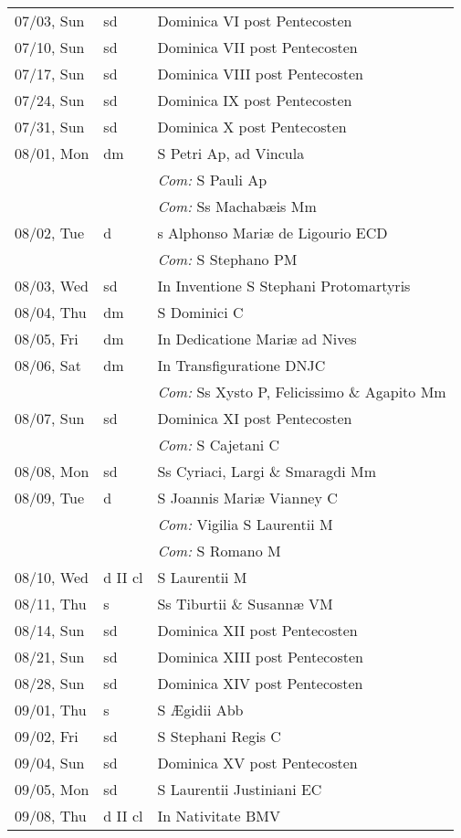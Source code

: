 \documentclass[10pt]{article}
\begin{document}
\begin{longtable}{ l l l }
07/03, Sun & sd & Dominica VI post Pentecosten\\
07/10, Sun & sd & Dominica VII post Pentecosten\\
07/17, Sun & sd & Dominica VIII post Pentecosten\\
07/24, Sun & sd & Dominica IX post Pentecosten\\
07/31, Sun & sd & Dominica X post Pentecosten\\
08/01, Mon & dm & S Petri Ap, ad Vincula\\
 & & \textit{Com:} S Pauli Ap\\
 & & \textit{Com:} Ss Machabæis Mm\\
08/02, Tue & d & s Alphonso Mariæ de Ligourio ECD\\
 & & \textit{Com:} S Stephano PM\\
08/03, Wed & sd & In Inventione S Stephani Protomartyris\\
08/04, Thu & dm & S Dominici C\\
08/05, Fri & dm & In Dedicatione Mariæ ad Nives\\
08/06, Sat & dm & In Transfiguratione DNJC\\
 & & \textit{Com:} Ss Xysto P, Felicissimo \& Agapito Mm\\
08/07, Sun & sd & Dominica XI post Pentecosten\\
 & & \textit{Com:} S Cajetani C\\
08/08, Mon & sd & Ss Cyriaci, Largi \& Smaragdi Mm\\
08/09, Tue & d & S Joannis Mariæ Vianney C\\
 & & \textit{Com:} Vigilia S Laurentii M\\
 & & \textit{Com:} S Romano M\\
08/10, Wed & d II cl & S Laurentii M\\
08/11, Thu & s & Ss Tiburtii \& Susannæ VM\\
08/14, Sun & sd & Dominica XII post Pentecosten\\
08/21, Sun & sd & Dominica XIII post Pentecosten\\
08/28, Sun & sd & Dominica XIV post Pentecosten\\
09/01, Thu & s & S Ægidii Abb\\
09/02, Fri & sd & S Stephani Regis C\\
09/04, Sun & sd & Dominica XV post Pentecosten\\
09/05, Mon & sd & S Laurentii Justiniani EC\\
09/08, Thu & d II cl & In Nativitate BMV\\

\end{longtable}
\end{document}
